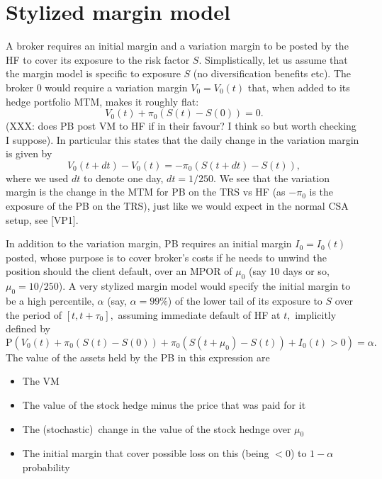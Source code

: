 \documentclass{article}
\begin{document}
\section{Stylized margin model}

A broker requires an initial margin and a variation margin to be posted by
the HF to cover its exposure to the risk factor $S.$ Simplistically, let us
assume that the margin model is specific to exposure $S$ (no diversification
benefits etc). The broker $0$ would require a variation margin $%
V_{0}=V_{0}(t)$ that, when added to its hedge portfolio MTM, makes it
roughly flat:%
\begin{equation}
V_{0}(t)+\pi _{0}\left( S(t)-S(0)\right) =0.  \label{eq:vm1}
\end{equation}
(XXX: does PB post VM to HF if in their favour? I think so but worth
checking I suppose). In particular this states that the daily change in the
variation margin is given by%
\[
V_{0}(t+dt)-V_{0}(t)=-\pi _{0}\left( S(t+dt)-S(t)\right) ,
\]%
where we used $dt$ to denote one day, $dt=1/250.$ We see that the variation
margin is the change in the MTM for PB on the TRS vs HF (as $-\pi _{0}$ is
the exposure of the PB on the TRS), just like we would expect in the normal
CSA setup, see [VP1].

In addition to the variation margin, PB requires an initial margin $%
I_{0}=I_{0}(t)$ posted, whose purpose is to cover broker's costs if he needs
to unwind the position should the client default, over an MPOR of $\mu _{0}$
(say 10 days or so, $\mu _{0}=10/250$). A very stylized margin model would
specify the initial margin to be a high percentile, $\alpha $ (say, $\alpha
=99\%$) of the lower tail of its exposure to $S$ over the period of $%
[t,t+\tau _{0}],$ assuming immediate default of HF at $t,$ implicitly
defined by%
\[
\mathrm{P}\left( V_{0}(t)+\pi _{0}\left( S(t)-S(0)\right) +\pi _{0}\left(
S(t+\mu _{0})-S(t)\right) +I_{0}(t)>0\right) =\alpha .
\]%
The value of the assets held by the PB in this expression are

\begin{itemize}
\item The VM

\item The value of the stock hedge minus the price that was paid for it

\item The (stochastic)\ change in the value of the stock hednge over $\mu
_{0}$

\item The initial margin that cover possible loss on this (being $<0$) to $%
1-\alpha $ probability
\end{itemize}
\end{document}
